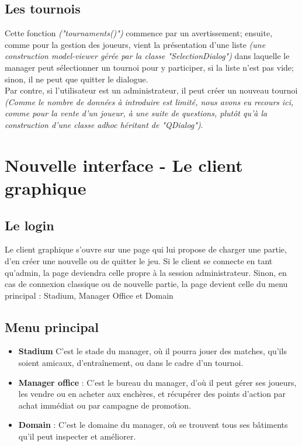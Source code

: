 \documentclass[a4paper,titlepage]{scrreprt}
\begin{document}
\subsection{Les tournois}
Cette fonction \emph{("tournaments()")} commence par un avertissement;
ensuite, comme pour la gestion des joueurs, vient la présentation d'une liste 
\emph{(une construction model-viewer gérée par la classe "SelectionDialog")}
dans laquelle le manager peut sélectionner un tournoi pour y participer,
si la liste n'est pas vide; sinon, il ne peut que quitter le dialogue.\\
Par contre, si l'utilisateur est un administrateur, il peut créer un nouveau tournoi
\emph{(Comme le nombre de données à introduire est limité,
nous avons eu recours ici, comme pour la vente d'un joueur, à une suite de questions,
plutôt qu'à la construction d'une classe adhoc héritant de "QDialog")}.

\section{Nouvelle interface - Le client graphique} \label{diag-client-graphique2}
\subsection{Le login}
Le client graphique s'ouvre sur une page qui lui propose de charger une partie, d'en créer une nouvelle ou de quitter le jeu. Si le client se connecte en tant qu'admin, la page deviendra celle propre à la session administrateur. Sinon, en cas de connexion classique ou de nouvelle partie, la page devient celle du menu principal : Stadium, Manager Office et Domain

\subsection{Menu principal}
\begin{itemize}
        \item \textbf{Stadium} C'est le stade du manager, où il pourra jouer des matches, qu'ils soient amicaux, d'entraînement, ou dans le cadre d'un tournoi.
        \item \textbf{Manager office} : C'est le bureau du manager, d'où il peut gérer ses joueurs, les vendre ou en acheter aux enchères, et récupérer des points d'action par achat immédiat ou par campagne de promotion.
        \item \textbf{Domain} : C'est le domaine du manager, où se trouvent tous ses bâtiments qu'il peut inspecter et améliorer.
      \end{itemize}
\end{document}

